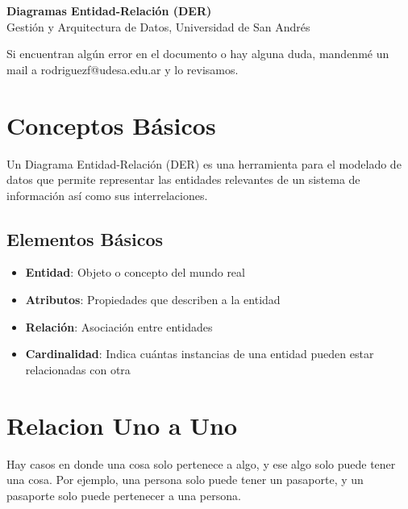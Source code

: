 \documentclass[12pt]{article}
\begin{document}
\begin{center}
  {\LARGE \textbf{Diagramas Entidad-Relación (DER)}}\\[0.5em]
  {Gestión y Arquitectura de Datos, Universidad de San Andrés}
\end{center}

Si encuentran algún error en el documento o hay alguna duda, mandenmé un mail a rodriguezf@udesa.edu.ar y lo revisamos.

\section{Conceptos Básicos}
Un Diagrama Entidad-Relación (DER) es una herramienta para el modelado de datos que permite representar las entidades relevantes de un sistema de información así como sus interrelaciones.

\subsection{Elementos Básicos}
\begin{itemize}
    \item \textbf{Entidad}: Objeto o concepto del mundo real
    \item \textbf{Atributos}: Propiedades que describen a la entidad
    \item \textbf{Relación}: Asociación entre entidades
    \item \textbf{Cardinalidad}: Indica cuántas instancias de una entidad pueden estar relacionadas con otra
\end{itemize}

\section{Relacion Uno a Uno}

Hay casos en donde una cosa solo pertenece a algo, y ese algo solo puede tener una cosa. Por ejemplo, una persona solo puede tener un pasaporte, y un pasaporte solo puede pertenecer a una persona.

\begin{center}
\end{center}
\end{document}

